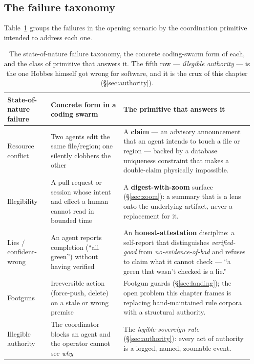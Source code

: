 \documentclass[11pt,a4paper]{article}
\theoremstyle{definition}
\theoremstyle{plain}
\begin{document}
\subsection{The failure taxonomy}\label{sec:taxonomy}
Table~\ref{tab:taxonomy} groups the failures in the opening scenario by
the coordination primitive intended to address each one.
\begin{table}[H]
\centering
\small
\renewcommand{\arraystretch}{1.3}
\begin{tabular}{@{}p{}p{}p{}@{}}
\toprule
\textbf{State-of-nature failure} & \textbf{Concrete form in a coding swarm} & \textbf{The primitive that answers it} \\
\midrule
Resource conflict & Two agents edit the same file/region; one silently clobbers the other &
A \textbf{claim} --- an advisory announcement that an agent intends to touch a
file or region --- backed by a database uniqueness constraint that makes a
double-claim physically impossible. \\
Illegibility & A pull request or session whose intent and effect a human cannot read in bounded time &
A \textbf{digest-with-zoom} surface (\S\ref{sec:zoom}): a summary that is a lens onto
the underlying artifact, never a replacement for it. \\
Lies / confident-wrong & An agent reports completion (``all green'') without having verified &
An \textbf{honest-attestation} discipline: a self-report that distinguishes
\emph{verified-good} from \emph{no-evidence-of-bad} and refuses to claim what it
cannot check --- ``a green that wasn't checked is a lie.'' \\
Footguns & Irreversible action (force-push, delete) on a stale or wrong premise &
Footgun guards (\S\ref{sec:landing}); the open problem this chapter frames is
replacing hand-maintained rule corpora with a structural authority. \\
Illegible authority & The coordinator blocks an agent and the operator cannot see \emph{why} &
The \emph{legible-sovereign rule} (\S\ref{sec:authority}): every act of authority is
a logged, named, zoomable event. \\
\bottomrule
\end{tabular}
\caption{The state-of-nature failure taxonomy, the concrete coding-swarm form of
each, and the class of primitive that answers it. The fifth row --- \emph{illegible
authority} --- is the one Hobbes himself got wrong for software, and it is the crux
of this chapter (\S\ref{sec:authority}).}
\label{tab:taxonomy}
\end{table}
\end{document}
